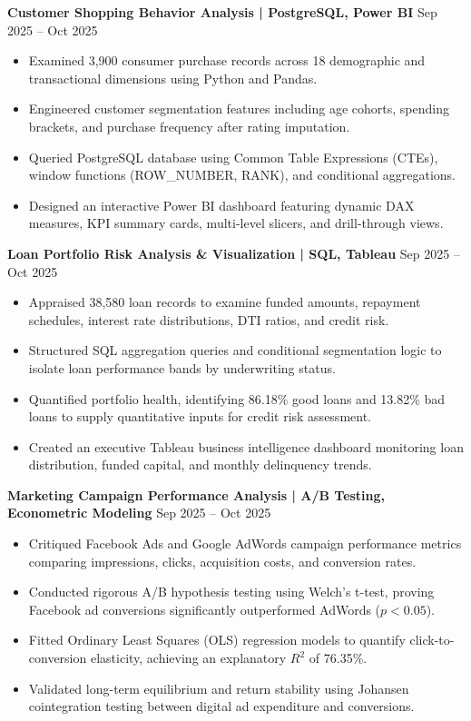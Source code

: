 \documentclass[10pt]{article}
\begin{document}
\textbf{Customer Shopping Behavior Analysis | PostgreSQL, Power BI} \hfill Sep 2025 -- Oct 2025
\begin{itemize}[noitemsep, topsep=2pt, partopsep=0pt, parsep=1.5pt]
    \item Examined 3,900 consumer purchase records across 18 demographic and transactional dimensions using Python and Pandas.
    \item Engineered customer segmentation features including age cohorts, spending brackets, and purchase frequency after rating imputation.
    \item Queried PostgreSQL database using Common Table Expressions (CTEs), window functions (ROW\_NUMBER, RANK), and conditional aggregations.
    \item Designed an interactive Power BI dashboard featuring dynamic DAX measures, KPI summary cards, multi-level slicers, and drill-through views.
\end{itemize}

\vspace{8pt}

\textbf{Loan Portfolio Risk Analysis \& Visualization | SQL, Tableau} \hfill Sep 2025 -- Oct 2025
\begin{itemize}[noitemsep, topsep=2pt, partopsep=0pt, parsep=1.5pt]
    \item Appraised 38,580 loan records to examine funded amounts, repayment schedules, interest rate distributions, DTI ratios, and credit risk.
    \item Structured SQL aggregation queries and conditional segmentation logic to isolate loan performance bands by underwriting status.
    \item Quantified portfolio health, identifying 86.18\% good loans and 13.82\% bad loans to supply quantitative inputs for credit risk assessment.
    \item Created an executive Tableau business intelligence dashboard monitoring loan distribution, funded capital, and monthly delinquency trends.
\end{itemize}

\vspace{8pt}

\textbf{Marketing Campaign Performance Analysis | A/B Testing, Econometric Modeling} \hfill Sep 2025 -- Oct 2025
\begin{itemize}[noitemsep, topsep=2pt, partopsep=0pt, parsep=1.5pt]
    \item Critiqued Facebook Ads and Google AdWords campaign performance metrics comparing impressions, clicks, acquisition costs, and conversion rates.
    \item Conducted rigorous A/B hypothesis testing using Welch's t-test, proving Facebook ad conversions significantly outperformed AdWords ($p < 0.05$).
    \item Fitted Ordinary Least Squares (OLS) regression models to quantify click-to-conversion elasticity, achieving an explanatory $R^2$ of 76.35\%.
    \item Validated long-term equilibrium and return stability using Johansen cointegration testing between digital ad expenditure and conversions.
\end{itemize}
\end{document}
